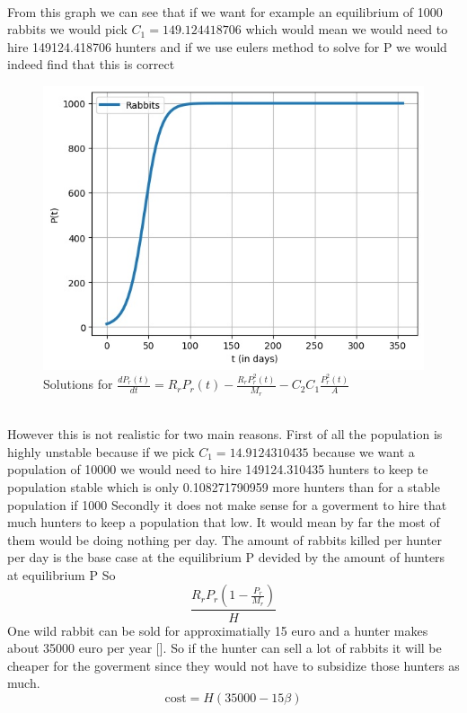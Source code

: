 \documentclass{article}
\begin{document}
\\
From this graph we can see that if we want for example an equilibrium of 1000 rabbits we would pick $C_1 = 149.124418706$ which would mean we would need to hire 149124.418706 hunters and if we use eulers method to solve for P we would indeed find that this is correct
\\
\begin{figure}[h!]
	\centering
	\includegraphics[scale=0.5]{Pictures/1000H}
	\caption{Solutions for $\frac{dP_r(t)}{dt} = R_rP_r(t)-\frac{R_rP_r^2(t)}{M_r} - C_2 C_1 \frac{P_r^2(t)}{A}$ }
	\label{fig:1000H}
\end{figure}
\\
However this is not realistic for two main reasons. First of all the population is highly unstable because if we pick $C_1 = 14.9124310435$ because we want a population of 10000 we would need to hire 149124.310435 hunters to keep te population stable which is only 0.108271790959 more hunters than for a stable population if 1000 Secondly it does not make sense for a goverment to hire that much hunters to keep a population that low. It would mean by far the most of them would be doing nothing per day.
The amount of rabbits killed per hunter per day is the base case at the equilibrium P devided by the amount of hunters at equilibrium P So
$$\frac{R_rP_r(1-\frac{P_r}{M_r})}{H}$$
One wild rabbit can be sold for approximatially 15 euro and a hunter makes about 35000 euro per year [\cite{MoneyHunting}]. So if the hunter can sell a lot of rabbits it will be cheaper for the goverment since they would not have to subsidize those hunters as much. 
$$\text{cost} = H(35000 -15\beta) $$
\end{document}
